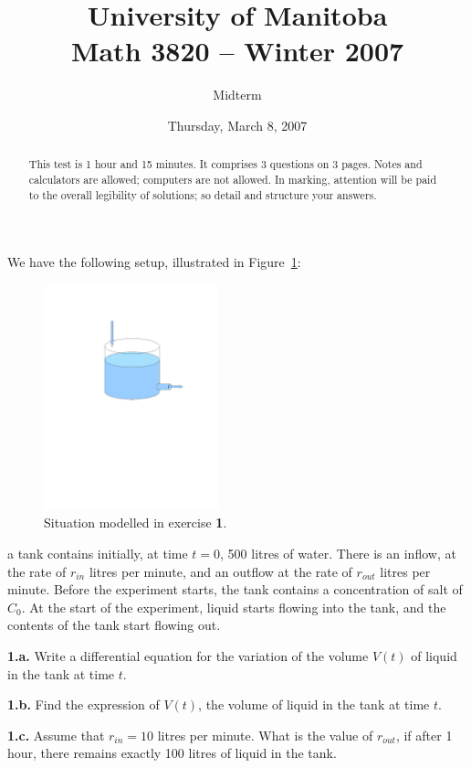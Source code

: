 \documentclass[12pt]{article}
\title{University of Manitoba\\ Math 3820 -- Winter 2007}
\author{Midterm}
\date{Thursday, March 8, 2007}
\theoremstyle{plain}
\begin{document}
\maketitle
\thispagestyle{empty}
\begin{abstract}
This test is 1 hour and 15 minutes. It comprises 3 questions on 3 pages. Notes and calculators are allowed; computers are not allowed.
In marking, attention will be paid to the overall legibility of solutions; so detail and structure your answers.
\end{abstract}



We have the following setup, illustrated in Figure~\ref{fig:dilution}:
\begin{figure}[htbp]
\begin{center}
\includegraphics[width=0.45\textwidth]{fig1_midterm2007}
\caption{Situation modelled in exercise {\bf 1}.}
\label{fig:dilution}
\end{center}
\end{figure}
a tank contains initially, at time $t=0$, 500 litres of water. There is an inflow, at the rate of $r_{in}$ litres per minute, and an outflow at the rate of $r_{out}$ litres per minute. Before the experiment starts, the tank contains a concentration of salt of $C_0$. At the start of the experiment, liquid starts flowing into the tank, and the contents of the tank start flowing out.

\noindent
{\bf 1.a.}
Write a differential equation for the variation of the volume $V(t)$ of liquid in the tank at time $t$.

\noindent
{\bf 1.b.} 
Find the expression of $V(t)$, the volume of liquid in the tank at time $t$.

\noindent
{\bf 1.c.} Assume that $r_{in}=10$ litres per minute. What is the value of $r_{out}$, if after 1 hour, there remains exactly 100 litres of liquid in the tank.
\end{document}
